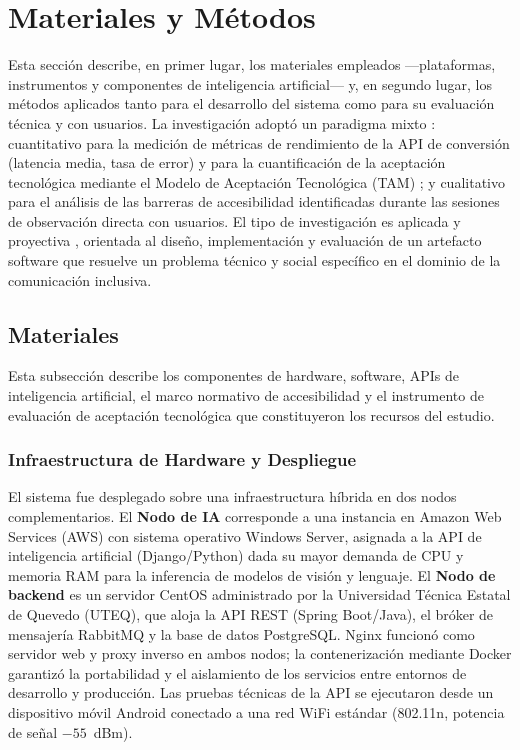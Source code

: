 \documentclass[journal]{IEEEtran}
\begin{document}
	\section{Materiales y M\'etodos}
	\label{sec:metodologia}
		Esta secci\'on describe, en primer lugar, los materiales empleados ---plataformas, instrumentos y componentes de inteligencia artificial--- y, en segundo lugar, los m\'etodos aplicados tanto para el desarrollo del sistema como para su evaluaci\'on t\'ecnica y con usuarios. La investigaci\'on adopt\'o un paradigma mixto \cite{hernandez2014}: cuantitativo para la medici\'on de m\'etricas de rendimiento de la API de conversi\'on (latencia media, tasa de error) y para la cuantificaci\'on de la aceptaci\'on tecnol\'ogica mediante el Modelo de Aceptaci\'on Tecnol\'ogica (TAM) \cite{davis1989}; y cualitativo para el an\'alisis de las barreras de accesibilidad identificadas durante las sesiones de observaci\'on directa con usuarios. El tipo de investigaci\'on es aplicada y proyectiva \cite{hernandez2014}, orientada al dise\~no, implementaci\'on y evaluaci\'on de un artefacto software que resuelve un problema t\'ecnico y social espec\'ifico en el dominio de la comunicaci\'on inclusiva.
		
		\subsection{Materiales}
			Esta subsecci\'on describe los componentes de hardware, software, APIs de inteligencia artificial, el marco normativo de accesibilidad y el instrumento de evaluaci\'on de aceptaci\'on tecnol\'ogica que constituyeron los recursos del estudio.
			
			\subsubsection{Infraestructura de Hardware y Despliegue}
				El sistema fue desplegado sobre una infraestructura h\'ibrida en dos nodos complementarios. El \textbf{Nodo de IA} corresponde a una instancia en Amazon Web Services (AWS) con sistema operativo Windows Server, asignada a la API de inteligencia artificial (Django/Python) dada su mayor demanda de CPU y memoria RAM para la inferencia de modelos de visi\'on y lenguaje. El \textbf{Nodo de backend} es un servidor CentOS administrado por la Universidad T\'ecnica Estatal de Quevedo (UTEQ), que aloja la API REST (Spring Boot/Java), el br\'oker de mensajer\'ia RabbitMQ y la base de datos PostgreSQL. Nginx funcion\'o como servidor web y proxy inverso en ambos nodos; la contenerizaci\'on mediante Docker garantiz\'o la portabilidad y el aislamiento de los servicios entre entornos de desarrollo y producci\'on. Las pruebas t\'ecnicas de la API se ejecutaron desde un dispositivo m\'ovil Android conectado a una red WiFi est\'andar (802.11n, potencia de se\~nal $-55$~dBm).
				
\end{document}
